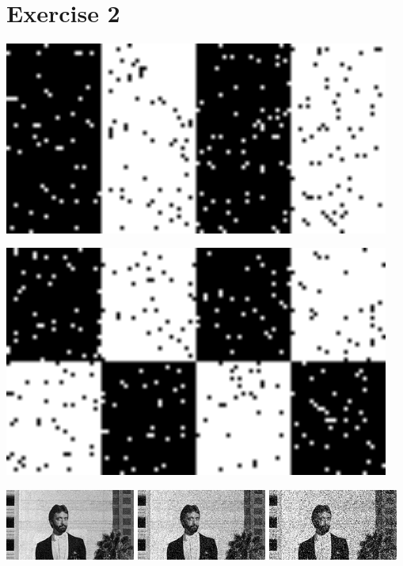 \documentclass[a4paper,11pt, final]{scrartcl}
\begin{document}
\section*{Exercise 2}

\begin{minipage}{0.5\textwidth}
{
\centering 
\includegraphics[width=0.95\textwidth]{ex2_stripes_noisy.png}
}  
\end{minipage}
\begin{minipage}{0.5\textwidth}
{
\centering 
\includegraphics[width=0.95\textwidth]{ex2_checker_noisy.png}
}
\end{minipage}

{
\centering 
\includegraphics[width=0.32\textwidth]{ex2_image_noisy_less_noise.png}
\includegraphics[width=0.32\textwidth]{ex2_image_noisy.png}
\includegraphics[width=0.32\textwidth]{ex2_image_noisy_more_noise.png}
}
\end{document}
